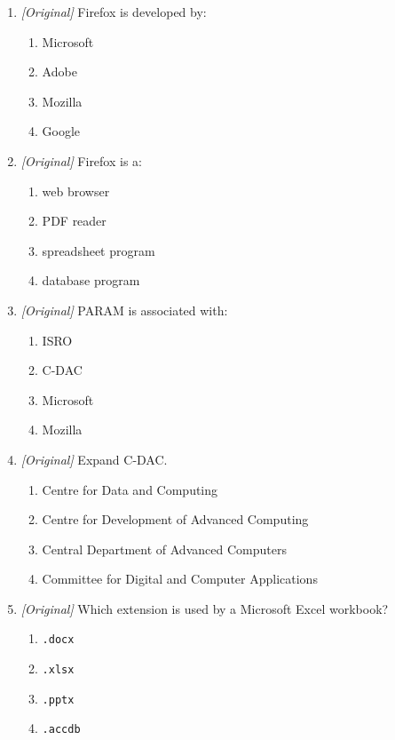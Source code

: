 \begin{enumerate}[label=\textbf{Q\arabic*.}, leftmargin=*]
\begin{enumerate}[label=\Alph*.]
    \item Microsoft Excel
  \end{enumerate}
\item \textit{[Original]} Firefox is developed by:
  \begin{enumerate}[label=\Alph*.]
    \item Microsoft
    \item Adobe
    \item Mozilla
    \item Google
  \end{enumerate}
\item \textit{[Original]} Firefox is a:
  \begin{enumerate}[label=\Alph*.]
    \item web browser
    \item PDF reader
    \item spreadsheet program
    \item database program
  \end{enumerate}
\item \textit{[Original]} PARAM is associated with:
  \begin{enumerate}[label=\Alph*.]
    \item ISRO
    \item C-DAC
    \item Microsoft
    \item Mozilla
  \end{enumerate}
\item \textit{[Original]} Expand C-DAC.
  \begin{enumerate}[label=\Alph*.]
    \item Centre for Data and Computing
    \item Centre for Development of Advanced Computing
    \item Central Department of Advanced Computers
    \item Committee for Digital and Computer Applications
  \end{enumerate}
\item \textit{[Original]} Which extension is used by a Microsoft Excel
  workbook?
  \begin{enumerate}[label=\Alph*.]
    \item \texttt{.docx}
    \item \texttt{.xlsx}
    \item \texttt{.pptx}
    \item \texttt{.accdb}
  \end{enumerate}

\end{enumerate}

